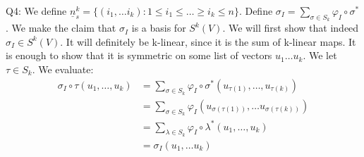 \documentclass[letterpaper]{article}
\begin{document}
Q4: We define $\underline{n}_s^k = \{ (i_1, \dots i_k): 1\leq i_1 \leq \dots \geq i_k \leq n \}$. Define $\sigma_{I} = \sum_{\sigma\in S_k} \varphi_{I} \circ \sigma^{*}$. We make the claim that $\sigma_I$ is a basis for $S^k(V)$.
We will first show that indeed $\sigma_I\in S^k(V)$. It will definitely be k-linear, since it is the sum of k-linear maps. It is enough to show that it is symmetric on some list of vectors $u_1\dots u_k$. We let $\tau\in S_k$. We evaluate: 
\begin{align*}
    \sigma_I \circ \tau (u_1 , \dots , u_k) & = \sum_{\sigma\in S_k} \varphi_I \circ \sigma^{*} (u_{\tau(1)} , \dots ,  u_{\tau(k)})
    \\ & = \sum_{\sigma \in S_k} \varphi_I (u_{\sigma(\tau(1))} , \dots u_{\sigma(\tau(k))})
    \\ & = \sum_{\lambda \in S_k} \varphi_I \circ \lambda^{*} ( u_1 , \dots , u_k) \tag{since for fixed  $\tau, \sigma\circ \tau$ ranges over $S_k$ }
    \\ & = \sigma_{I}(u_1, \dots u_k)
\end{align*} 
\end{document}
